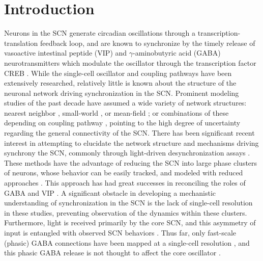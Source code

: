 \section{Introduction}
Neurons in the SCN generate circadian oscillations through a transcription-translation feedback loop, and are known to synchronize by the timely release of vasoactive intestinal peptide (VIP) and $\gamma$-aminobutyric acid (GABA) neurotransmitters which modulate the oscillator through the transcription factor CREB \cite{Aton2005,Albus2005, Welsh2010,Evans2013,DeWoskin2015}.
While the single-cell oscillator and coupling pathways have been extensively researched, relatively little is known about the structure of the neuronal network driving synchronization in the SCN. 
Prominent modeling studies of the past decade have assumed a wide variety of network structures: nearest neighbor \cite{To2007, An2013}, small-world \cite{Vasalou2009}, or mean-field \cite{Bernard2007, DeWoskin2014}; or combinations of these depending on coupling pathway \cite{DeWoskin2015}, pointing to the high degree of uncertainty regarding the general connectivity of the SCN.
There has been significant recent interest in attempting to elucidate the network structure and mechanisms driving synchrony the SCN, commonly through light-driven desynchronization assays \cite{Meijer2010, Evans2013, Evans2015, Myung2015}.
These methods have the advantage of reducing the SCN into large phase clusters of neurons, whose behavior can be easily tracked, and modeled with reduced approaches \cite{Myung2015}.
This approach has had great successes in reconciling the roles of GABA and VIP \cite{Albus2005, Evans2013, Myung2015, DeWoskin2015}.
A significant obstacle in developing a mechanistic understanding of synchronization in the SCN is the lack of single-cell resolution in these studies, preventing observation of the dynamics within these clusters.
Furthermore, light is received primarily by the core SCN, and this asymmetry of input is entangled with observed SCN behaviors \cite{Albus2005}.
Thus far, only fast-scale (phasic) GABA connections have been mapped at a single-cell resolution \cite{Freeman2013a}, and this phasic GABA release is not thought to affect the core oscillator \cite{DeWoskin2015}.


